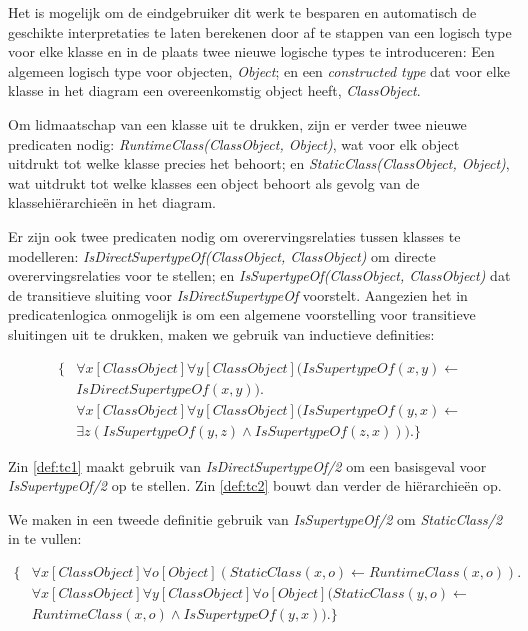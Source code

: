 Het is mogelijk om de eindgebruiker dit werk te besparen en automatisch de geschikte interpretaties te laten berekenen door af te stappen van een logisch type voor elke klasse en in de plaats twee nieuwe logische types te introduceren: Een algemeen logisch type voor objecten, \textit{Object}; en een \textit{constructed type}\cite{DeCatBroes2014PLaa} dat voor elke klasse in het diagram een overeenkomstig object heeft, \textit{ClassObject}.

Om lidmaatschap van een klasse uit te drukken, zijn er verder twee nieuwe predicaten nodig: \textit{RuntimeClass(ClassObject, Object)}, wat voor elk object uitdrukt tot welke klasse precies het behoort; en \textit{StaticClass(ClassObject, Object)}, wat uitdrukt tot welke klasses een object behoort als gevolg van de klassehi\"erarchie\"en in het diagram.

Er zijn ook twee predicaten nodig om overervingsrelaties tussen klasses te modelleren: \textit{IsDirectSupertypeOf(ClassObject, ClassObject)} om directe overervingsrelaties voor te stellen; en \textit{IsSupertypeOf(ClassObject, ClassObject)} dat de transitieve sluiting voor \textit{IsDirectSupertypeOf} voorstelt. Aangezien het in predicatenlogica onmogelijk is om een algemene voorstelling voor transitieve sluitingen uit te drukken, maken we gebruik van inductieve definities\cite{DeCatBroes2014PLaa}:

\begin{align}
\{
\nonumber &\forall{x}[ClassObject]\forall{y}[ClassObject](\mathit{IsSupertypeOf}(x,y) \leftarrow \\ &\mathit{IsDirectSupertypeOf}(x,y)).\label{def:tc1} \\
\nonumber &\forall{x}[ClassObject]\forall{y}[ClassObject](\mathit{IsSupertypeOf}(y,x) \leftarrow \\
&\exists{z}(\mathit{IsSupertypeOf(y,z)} \land \mathit{IsSupertypeOf}(z,x))).\label{def:tc2}
\}
\end{align}

\sloppy Zin \ref{def:tc1} maakt gebruik van \textit{IsDirectSupertypeOf/2} om een basisgeval voor \\ \textit{IsSupertypeOf/2} op te stellen. Zin \ref{def:tc2} bouwt dan verder de hi\"erarchie\"en op.

We maken in een tweede definitie gebruik van \textit{IsSupertypeOf/2} om \textit{StaticClass/2} in te vullen:

\begin{align*}
\{
&\forall{x}[ClassObject]\forall{o}[Object](StaticClass(x,o) \leftarrow RuntimeClass(x,o)). \\
&\forall{x}[ClassObject]\forall{y}[ClassObject]\forall{o}[Object](StaticClass(y,o) \leftarrow \\ &RuntimeClass(x,o) \land \mathit{IsSupertypeOf}(y,x)).
\}
\end{align*}

